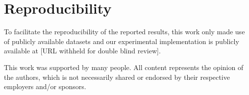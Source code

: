 \documentclass[sigconf,natbib,screen=true,review=true,anonymous]{acmart}
\begin{document}
\maketitle

\acresetall









\section*{Reproducibility}
To facilitate the reproducibility of the reported results, this work only made use of publicly available datasets and our experimental implementation is publicly available at [URL withheld for double blind review].

\begin{acks}
 This work was supported by many people.
 All content represents the opinion of the authors, which is not necessarily shared or endorsed by their respective employers and/or sponsors.
\end{acks}



\end{document}
